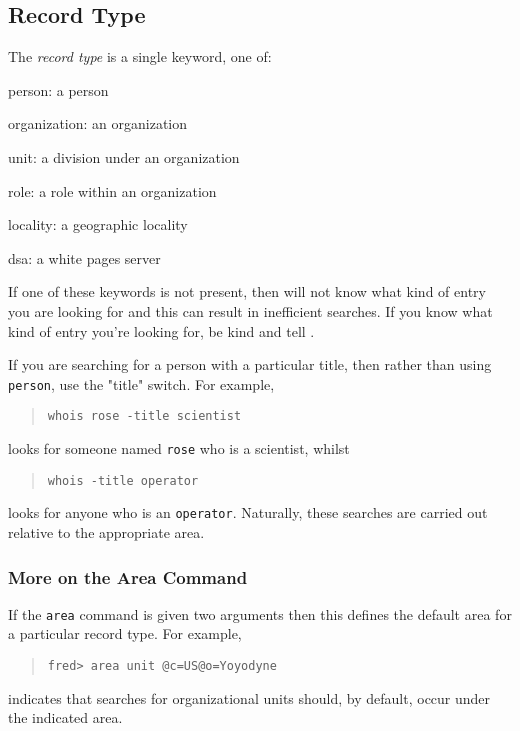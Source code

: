 \subsection	{Record Type}
The {\em record type\/} is a single keyword,
one of:
\begin{describe}
\item[person:]		a person

\item[organization:]	an organization

\item[unit:]		a division under an organization

\item[role:]		a role within an organization

\item[locality:]	a geographic locality

\item[dsa:]		a white pages server
\end{describe}
If one of these keywords is not present,
then  will not know what kind of entry you are looking for and
this can result in inefficient searches.
If you know what kind of entry you're looking for,
be kind and tell .

If you are searching for a person with a particular title,
then rather than using \verb"person",
use the \switch"title" switch.
For example,
\begin{quote}\small\begin{verbatim}
whois rose -title scientist
\end{verbatim}\end{quote}
looks for someone named \verb"rose" who is a scientist,
whilst
\begin{quote}\small\begin{verbatim}
whois -title operator
\end{verbatim}\end{quote}
looks for anyone who is an \verb"operator".
Naturally,
these searches are carried out relative to the appropriate area.

\subsubsection	{More on the Area Command}
If the \verb"area" command is given two arguments then this defines the
default area for a particular record type.
For example,
\begin{quote}\small\begin{verbatim}
fred> area unit @c=US@o=Yoyodyne
\end{verbatim}\end{quote}
indicates that searches for organizational units should,
by default,
occur under the indicated area.

